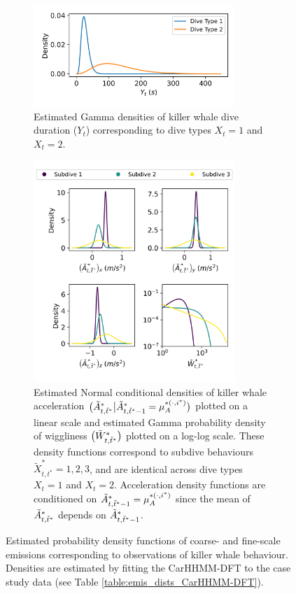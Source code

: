 \begin{figure}[ht]
    \begin{subfigure}{\textwidth}
    	\centering
    	\includegraphics[width=3in]{../Plots/2019/20190902-182840-CATs_OB_1_0_267_CarHHMM2-coarse-emissions.png}
    	\caption{Estimated Gamma densities of killer whale dive duration ($Y_t$) corresponding to dive types $X_t = 1$ and $X_t = 2$.}
    	\label{fig:coarse_emis}
    \end{subfigure}
    \newline
    \begin{subfigure}{\textwidth}
    	\centering
    	\includegraphics[width=3in]{../Plots/2019/20190902-182840-CATs_OB_1_0_267_CarHHMM2-fine-emissions.png}
    	\caption{Estimated Normal conditional densities %
    	of killer whale acceleration $\big(\tilde{A}^*_{t,\tilde t^*}\big|\tilde{A}^*_{t,\tilde t^*-1} = \mu_A^{*(\cdot,i^*)}\big)$ plotted on a linear scale and estimated Gamma probability density of wiggliness $\big(\tilde{W}^*_{t,\tilde t^*}\big)$ plotted on a log-log scale. These density functions correspond to subdive behaviours $\tilde{X}^*_{t,t^*} = 1,2,3$, and are identical across dive types $X_t = 1$ and $X_t = 2$. Acceleration density functions are conditioned on $\tilde{A}^*_{t,\tilde t^*-1} = \mu_A^{*(\cdot,i^*)}$ since the mean of $\tilde{A}^*_{t,\tilde t^*}$ depends on $\tilde{A}^*_{t,\tilde t^*-1}$.}
    	\label{fig:fine_emis}
    \end{subfigure}
    \caption{Estimated probability density functions of coarse- and fine-scale emissions corresponding to observations of killer whale behaviour. Densities are estimated by fitting the CarHHMM-DFT to the case study data (see Table \ref{table:emis_dists_CarHHMM-DFT}).}
    \label{fig:emis}
\end{figure}

